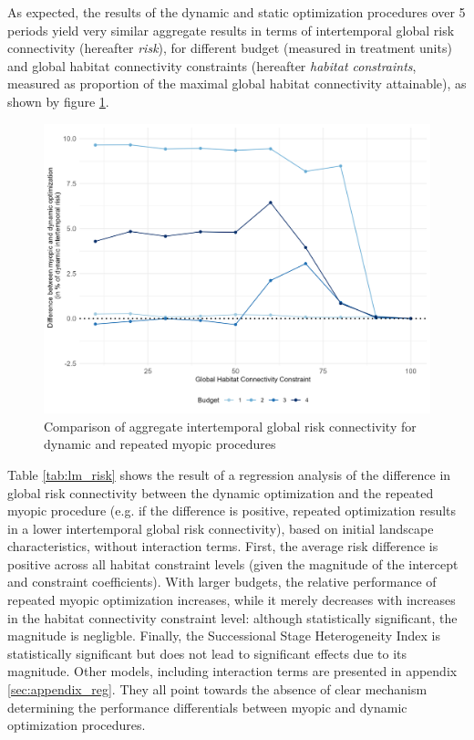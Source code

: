 As expected, the results of the dynamic and static optimization procedures over 5 periods yield very similar aggregate results in terms of intertemporal global risk connectivity (hereafter \textit {risk}), for different budget (measured in treatment units) and global habitat connectivity constraints (hereafter \textit{habitat constraints}, measured as proportion of the maximal global habitat connectivity attainable), as shown by figure \ref{fig:risk_diff}.

\begin{figure}[h]
    \centering
    \includegraphics[width = .8\linewidth]{figures/wildland/aggregate_risk_diff.jpg}
    \caption{Comparison of aggregate intertemporal global risk connectivity for dynamic and repeated myopic procedures}
    \label{fig:risk_diff}
\end{figure}
 
Table \ref{tab:lm_risk} shows the result of a regression analysis of the difference in global risk connectivity between the dynamic optimization and the repeated myopic procedure (e.g. if the difference is positive, repeated optimization results in a lower intertemporal global risk connectivity), based on initial landscape characteristics, without interaction terms. First, the average risk difference is positive across all habitat constraint levels (given the magnitude of the intercept and constraint coefficients). With larger budgets, the relative performance of repeated myopic optimization increases, while it merely decreases with increases in the habitat connectivity constraint level: although statistically significant, the magnitude is negligble. Finally, the Successional Stage Heterogeneity Index is statistically significant but does not lead to significant effects due to its magnitude. Other models, including interaction terms are presented in appendix \ref{sec:appendix_reg}. They all point towards the absence of clear mechanism determining the performance differentials between myopic and dynamic optimization procedures.


